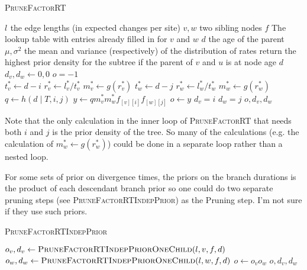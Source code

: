\documentclass{llncs}
\newcommand{\tree}[0]{\ensuremath{T}\xspace}
\newcommand{\edgeLen}[1]{\ensuremath{l_{#1}}\xspace}
\newcommand{\subtreeOptFactor}[2]{\ensuremath{f_{[{#1}][{#2}]}}\xspace}
\newcommand{\ratePriorDensity}[0]{\ensuremath{g}\xspace}
\newcommand{\timePriorDensity}[0]{\ensuremath{h}\xspace}
\begin{document}
\begin{algorithm} \caption{\textsc{PruneFactorRT}}\label{pruneFactorRT}
\begin{algorithmic}
    \REQUIRE $\edgeLen{}$ the edge lengths (in expected changes per site)
\REQUIRE $v, w$ two sibling nodes
\REQUIRE $f$ The lookup table with entries already filled in for $v$ and $w$
\REQUIRE $d$ the age of the parent
\REQUIRE $\mu, \sigma^2$ the mean and variance (respectively) of the distribution of rates
\ENSURE return the highest prior density for the subtree if the parent of $v$ and $u$ is at node age $d$\\
\STATE $d_v, d_w \leftarrow 0, 0$
\STATE $o = -1$ \\
\FOR{$i \in [0, 1, \ldots, d)$ }
    \STATE $t_v^{\ast} \leftarrow d - i$
    \STATE $r_v^{\ast} \leftarrow l_v^{\ast} / t_v^{\ast}$
    \STATE $m_v^{\ast} \leftarrow \ratePriorDensity(r_v^{\ast})$
    \FOR{$j \in [0, 1, \ldots, d)$ }
        \STATE $t_w^{\ast} \leftarrow d - j$
        \STATE $r_w^{\ast} \leftarrow l_w^{\ast} / t_w^{\ast}$
        \STATE $m_w^{\ast} \leftarrow \ratePriorDensity(r_w^{\ast})$
        \STATE $q \leftarrow \timePriorDensity(d \mid \tree, i, j)$
        \STATE $y \leftarrow q m_v^{\ast} m_w^{\ast} \subtreeOptFactor{v}{i} \subtreeOptFactor{w}{j}$
            \STATE $o \leftarrow y$
            \STATE $d_v = i$
            \STATE $d_w = j$
        \ENDIF
    \ENDFOR
\ENDFOR
\RETURN $o, d_v, d_w$
\end{algorithmic}
\end{algorithm}

Note that the only calculation in the inner loop of \textsc{PruneFactorRT} that needs both $i$ and $j$ is the prior density of the tree.
So many of the calculations (e.g. the calculation of $m_w^{\ast} \leftarrow \ratePriorDensity(r_w^{\ast})$)
could be done in a separate loop rather than a nested loop.

For some sets of prior on divergence times, the priors on the branch durations is 
the product of each descendant branch prior so one could do two separate pruning
steps
(see \textsc{PruneFactorRTIndepPrior}) as the Pruning step.
I'm not sure if they use such priors.

\begin{algorithm} \caption{\textsc{PruneFactorRTIndepPrior}}\label{pruneFactorRTIndep}
\begin{algorithmic}
    \STATE $o_v, d_v\leftarrow \mbox{\textsc{PruneFactorRTIndepPriorOneChild}}(l, v, f, d)$
    \STATE $o_w, d_w\leftarrow \mbox{\textsc{PruneFactorRTIndepPriorOneChild}}(l, w, f, d)$
    \STATE $o \leftarrow o_v o_w$
    \RETURN $o, d_v, d_w$
\end{algorithmic}
\end{algorithm}
\end{document}
